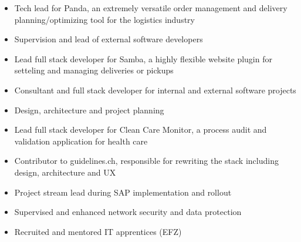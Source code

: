 \documentclass[10pt,a4paper]{altacv}
\begin{document}

\begin{fullwidth}
\makecvheader
\end{fullwidth}


\begin{itemize}
\item Tech lead for Panda, an extremely versatile order management and delivery planning/optimizing tool for the logistics industry
\item Supervision and lead of external software developers
\item Lead full stack developer for Samba, a highly flexible website plugin for setteling and managing deliveries or pickups
\item Consultant and full stack developer for internal and external software projects
\end{itemize}
\divider

\begin{itemize}
\item Design, architecture and project planning
\item Lead full stack developer for Clean Care Monitor, a process audit and validation application for health care
\item Contributor to guidelines.ch, responsible for rewriting the stack including design, architecture and UX
\end{itemize}
\divider

\begin{itemize}
\item Project stream lead during SAP implementation and rollout
\item Supervised and enhanced network security and data protection
\item Recruited and mentored IT apprentices (EFZ)
\end{itemize}
\divider


\end{document}
